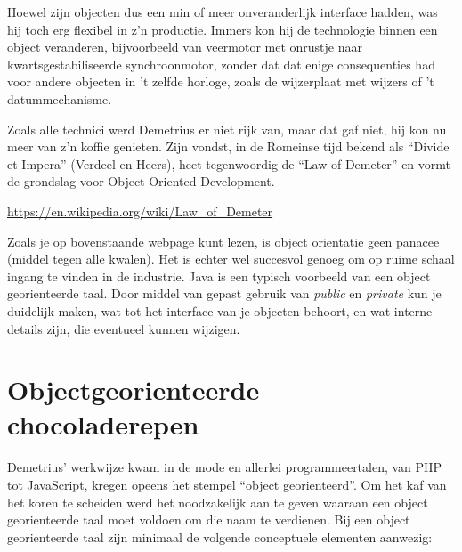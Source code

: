 \documentclass[a4paper,11pt]{article}
\begin{document}
\begin{framed}
Hoewel zijn objecten dus een min of meer onveranderlijk interface hadden, was hij toch erg flexibel in z'n productie.
Immers kon hij de technologie binnen een object veranderen,
bijvoorbeeld van veermotor met onrustje naar kwartsgestabiliseerde synchroonmotor,
zonder dat dat enige consequenties had voor andere objecten in 't zelfde horloge,
zoals de wijzerplaat met wijzers of 't datummechanisme.

Zoals alle technici werd Demetrius er niet rijk van,
maar dat gaf niet, hij kon nu meer van z'n koffie genieten.
Zijn vondst, in de Romeinse tijd bekend als ``Divide et Impera'' (Verdeel en Heers),
heet tegenwoordig de ``Law of Demeter'' en vormt de grondslag voor Object Oriented Development.

\url{https://en.wikipedia.org/wiki/Law_of_Demeter}

Zoals je op bovenstaande webpage kunt lezen, is object orientatie geen panacee (middel tegen alle kwalen).
Het is echter wel succesvol genoeg om op ruime schaal ingang te vinden in de industrie.
Java is een typisch voorbeeld van een object georienteerde taal.
Door middel van gepast gebruik van \emph{public} en \emph{private} kun je duidelijk maken,
wat tot het interface van je objecten behoort, en wat interne details zijn, die eventueel kunnen wijzigen.
\end{framed}

\section{Objectgeorienteerde chocoladerepen}

Demetrius' werkwijze kwam in de mode en allerlei programmeertalen, van PHP tot JavaScript, kregen opeens het stempel ``object georienteerd''.
Om het kaf van het koren te scheiden werd het noodzakelijk aan te geven waaraan een object georienteerde taal moet voldoen om die naam te verdienen.
Bij een object georienteerde taal zijn minimaal de volgende conceptuele elementen aanwezig:
\end{document}
